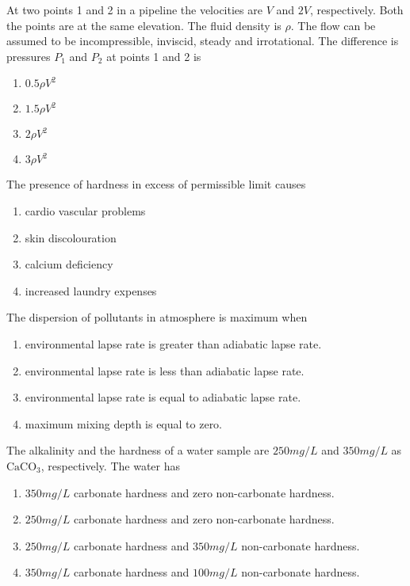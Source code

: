 	\item
	At two points 1 and 2 in a pipeline the velocities are $V$ and $2V$, respectively. Both the points are at the same elevation. The fluid density is $\rho$. The flow can be assumed to be incompressible, inviscid, steady and irrotational. The difference is pressures $P_1$ and $P_2$ at points 1 and 2 is
		\begin{enumerate}
			\item $0.5\rho V^2$
			\item $1.5\rho V^2$
			\item $2\rho V^2$
			\item $3\rho V^2$
		\end{enumerate}
	\item
	The presence of hardness in excess of permissible limit causes 
		\begin{enumerate}
			\item cardio vascular problems
			\item skin discolouration
			\item calcium deficiency
			\item increased laundry expenses
		\end{enumerate}
	\item
	The dispersion of pollutants in atmosphere is maximum when
		\begin{enumerate}
			\item environmental lapse rate is greater than adiabatic lapse rate.
			\item environmental lapse rate is less than adiabatic lapse rate.
			\item environmental lapse rate is equal to adiabatic lapse rate.
			\item maximum mixing depth is equal to zero.
		\end{enumerate}
	\item 
	The alkalinity and the hardness of a water sample are $250 mg/L$ and $350 mg/L$ as $\text{CaCO}_3$, respectively. The water has 
		\begin{enumerate}
			\item $350 mg/L$ carbonate hardness and zero non-carbonate hardness.
			\item $250 mg/L$ carbonate hardness and zero non-carbonate hardness.
			\item $250 mg/L$ carbonate hardness and $350 mg/L$ non-carbonate hardness.
			\item $350 mg/L$ carbonate hardness and $100 mg/L$ non-carbonate hardness.
		\end{enumerate}
